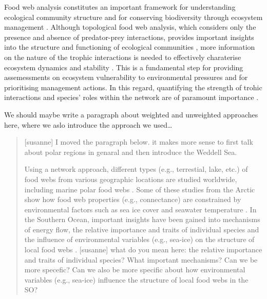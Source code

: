 \documentclass[gc, manuscript]{copernicus}
\begin{document}
Food web analysis constitutes an important framework for understanding
ecological community structure and for conserving biodiversity through
ecosystem management \citep{Thompson2012}. Although topological food web
analysis, which considers only the presence and absence of predator-prey
interactions, provides important insights into the structure and
functioning of ecological communities
\citep[e.g.][]{Pascual2006, Kortsch2015, Marina2018, Cordone2020, Rodriguez2022},
more information on the nature of the trophic interactions is needed to
effectively charaterise ecosystem dynamics and stability
\citep[\citet{otherRefs}]{Kortsch2021}. This is a fundamental step for
providing assemessments on ecosystem vulnerability to environmental
pressures and for prioritising management actions. In this regard,
quantifying the strength of trohic interactions and species' roles
within the network are of paramount importance
\citep{Carrara2015, Allesina2015, Nilsson2016, Cirtwill2018a}.

We should maybe write a paragraph about weighted and unweighted
approaches here, where we aslo introduce the approach we used\ldots{}

\begin{quote}
{[}susanne{]} I moved the paragraph below. it makes more sense to first
talk about polar regions in genaral and then introduce the Weddell Sea.

Using a network approach, different types (e.g., terrestial, lake, etc.)
of food webs from various geographic locations are studied worldwide,
including marine polar food webs
\citep{Carscallen2012, Santana2013, Kortsch2019, Pecuchet2022}. Some of
these studies from the Arctic show how food web properties (e.g.,
connectance) are constrained by environmental factors such as sea ice
cover and seawater temperature \citep{Kortsch2019, Pecuchet2022}. In the
Southern Ocean, important insights have been gained into mechanisms of
energy flow, the relative importance and traits of individual species
and the influence of environmental variables (e.g., sea-ice) on the
structure of local food webs \citep{Cordone2020, Rossi2019}.
{[}susanne{]} what do you mean here: the relative importance and traits
of individual species? What important mechanisms? Can we be more
specefic? Can we also be more specific about how environmental variables
(e.g., sea-ice) influence the structure of local food webs in the SO?
\end{quote}
\end{document}
